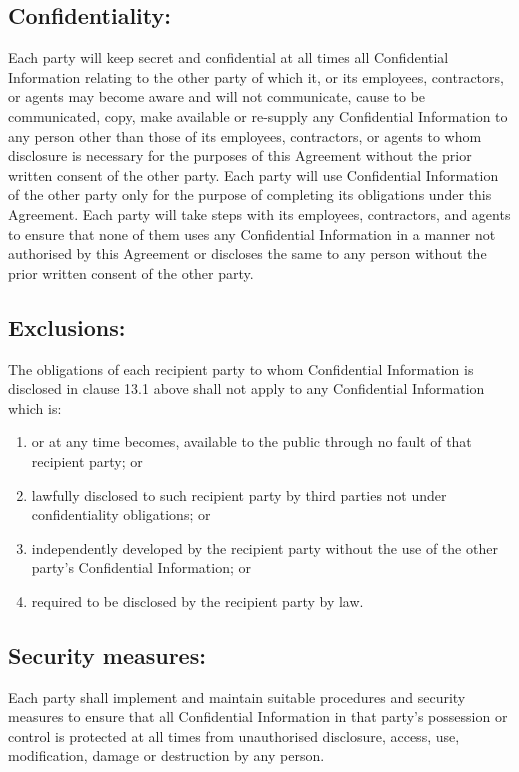 \documentclass[a4paper,12pt]{article}
\begin{document}
\subsection{Confidentiality:}  Each party will keep secret and confidential at all times all Confidential Information relating to the other party of which it, or its employees, contractors, or agents may become aware and will not communicate, cause to be communicated, copy, make available or re-supply any Confidential Information to any person other than those of its employees, contractors, or agents to whom disclosure is necessary for the purposes of this Agreement without the prior written consent of the other party.  Each party will use Confidential Information of the other party only for the purpose of completing its obligations under this Agreement.  Each party will take steps with its employees, contractors, and agents to ensure that none of them uses any Confidential Information in a manner not authorised by this Agreement or discloses the same to any person without the prior written consent of the other party.
\subsection{Exclusions:}  The obligations of each recipient party to whom Confidential Information is disclosed in clause 13.1 above shall not apply to any Confidential Information which is:
\begin{enumerate}
\item or at any time becomes, available to the public through no fault of that recipient party; or 
\item lawfully disclosed to such recipient party by third parties not under confidentiality obligations; or 
\item independently developed by the recipient party without the use of the other party’s Confidential Information; or
\item required to be disclosed by the recipient party by law.  
\end{enumerate}

\subsection{Security measures:}  Each party shall implement and maintain suitable procedures and security measures to ensure that all Confidential Information in that party’s possession or control is protected at all times from unauthorised disclosure, access, use, modification, damage or destruction by any person.
\end{document}
